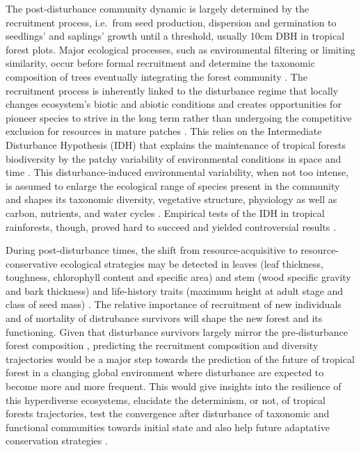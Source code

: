 \documentclass[fleqn,10pt]{ArtEcoFoG} %
\begin{document}
The post-disturbance community dynamic is largely determined by the
recruitment process, i.e.~from seed production, dispersion and
germination to seedlings' and saplings' growth until a threshold,
usually 10cm DBH in tropical forest plots. Major ecological processes,
such as environmental filtering or limiting similarity, occur before
formal recruitment and determine the taxonomic composition of trees
eventually integrating the forest community \citep{Ackerly2003}. The
recruitment process is inherently linked to the disturbance regime that
locally changes ecosystem's biotic and abiotic conditions and creates
opportunities for pioneer species to strive in the long term rather than
undergoing the competitive exclusion for resources in mature patches
\citep{Denslow1980}. This relies on the Intermediate Disturbance
Hypothesis (IDH) that explains the maintenance of tropical forests
biodiversity by the patchy variability of environmental conditions in
space and time \citep{Guitet2018}. This disturbance-induced
environmental variability, when not too intense, is assumed to enlarge
the ecological range of species present in the community
\citep{Molino2001, Bongers2009} and shapes its taxonomic diversity,
vegetative structure, physiology as well as carbon, nutrients, and water
cycles \citep{Anderson-Teixeira2013}. Empirical tests of the IDH in
tropical rainforests, though, proved hard to succeed and yielded
controversial results \citep{Hubbell1999, Molino2001, Sheil2003}.

During post-disturbance times, the shift from resource-acquisitive to
resource-conservative ecological strategies may be detected in leaves
(leaf thickness, toughness, chlorophyll content and specific area) and
stem (wood specific gravity and bark thickness) and life-history traits
(maximum height at adult stage and class of seed mass)
\citep{Wright2004, Chave2009b, Herault2011}. The relative importance of
recruitment of new individuals and of mortality of distrubance survivors
will shape the new forest and its functioning. Given that disturbance
survivors largely mirror the pre-disturbance forest composition
\citep{Piponiot2018}, predicting the recruitment composition and
diversity trajectories would be a major step towards the prediction of
the future of tropical forest in a changing global environment where
disturbance are expected to become more and more frequent. This would
give insights into the resilience of this hyperdiverse ecosystems,
elucidate the determinism, or not, of tropical forests trajectories,
test the convergence after disturbance of taxonomic and functional
communities towards initial state and also help future adaptative
conservation strategies \citep{Diaz2005, Gardner2007, Schwartz2017}.
\end{document}
